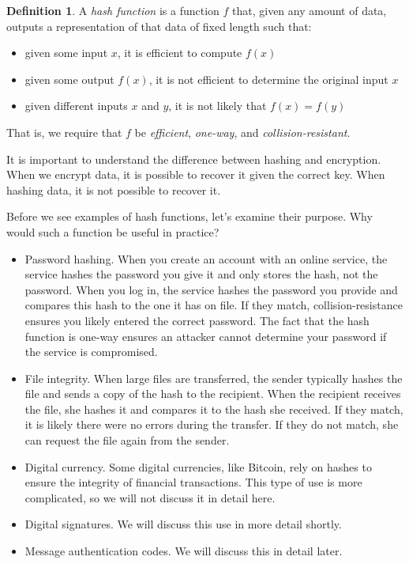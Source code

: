 \documentclass{book}
\theoremstyle{plain}
\theoremstyle{definition}
\newtheorem{definition}[theorem]{Definition}
\begin{document}
\begin{definition}
A {\it hash function} is a function $f$ that, given any amount of data, outputs a representation of that data of fixed length such that:
\begin{itemize}
\item given some input $x$, it is efficient to compute $f(x)$
\item given some output $f(x)$, it is not efficient to determine the original input $x$
\item given different inputs $x$ and $y$, it is not likely that $f(x) = f(y)$
\end{itemize}
That is, we require that $f$ be {\it efficient}, {\it one-way}, and {\it collision-resistant}.
\end{definition}

It is important to understand the difference between hashing and encryption. When we encrypt data, it is possible to recover it given the correct key. When hashing data, it is not possible to recover it.

Before we see examples of hash functions, let's examine their purpose. Why would such a function be useful in practice?

\begin{itemize}
\item{Password hashing.} When you create an account with an online service, the service hashes the password you give it and only stores the hash, not the password. When you log in, the service hashes the password you provide and compares this hash to the one it has on file. If they match, collision-resistance ensures you likely entered the correct password. The fact that the hash function is one-way ensures an attacker cannot determine your password if the service is compromised.
\item{File integrity.} When large files are transferred, the sender typically hashes the file and sends a copy of the hash to the recipient. When the recipient receives the file, she hashes it and compares it to the hash she received. If they match, it is likely there were no errors during the transfer. If they do not match, she can request the file again from the sender.
\item{Digital currency.} Some digital currencies, like Bitcoin, rely on hashes to ensure the integrity of financial transactions. This type of use is more complicated, so we will not discuss it in detail here.
\item{Digital signatures.} We will discuss this use in more detail shortly.
\item{Message authentication codes.} We will discuss this in detail later.
\end{itemize}
\end{document}

